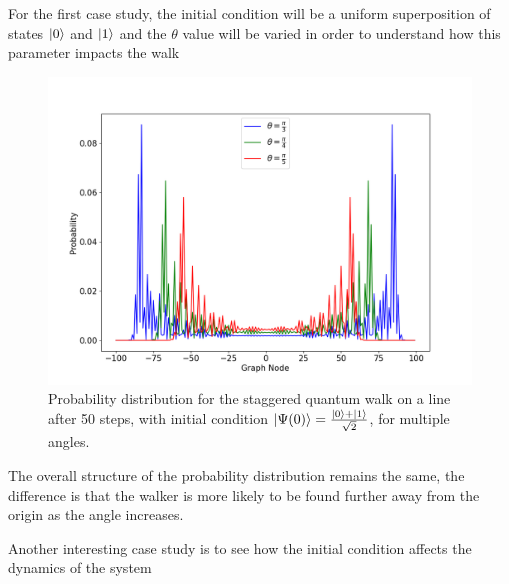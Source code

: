                 For the first case study, the initial condition will be a uniform superposition of states $\ket{0}$ and $\ket{1}$ and the $\theta$ value will be varied in order to understand how this parameter impacts the walk
                
            	\begin{figure}[!h]
                    \centering
                    \includegraphics[scale=0.40]{img/StagQW/stagqwMultiple.png}
                    \caption{Probability distribution for the staggered quantum walk on a line after 50 steps, with initial condition $\ket{\Psi(0)}=\frac{\ket{0}+\ket{1}}{\sqrt{2}}$, for multiple angles.} 
                    \label{fig:fig5}
                \end{figure}
                
                The overall structure of the probability distribution remains the same, the difference is that the walker is more likely to be found further away from the origin as the angle increases.\par
                Another interesting case study is to see how the initial condition affects the dynamics of the system
                
